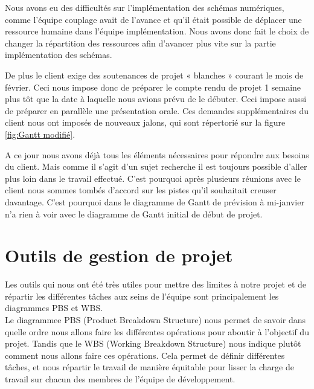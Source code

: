 \documentclass[a4paper,12pt]{report}
\theoremstyle{break}
\begin{document}
Nous avons eu des difficultés sur l’implémentation des schémas numériques, comme l’équipe couplage avait de l’avance et qu’il était possible de déplacer une ressource humaine dans l’équipe implémentation. Nous avons donc fait le choix de changer la répartition des ressources afin d’avancer plus vite sur la partie implémentation des schémas. 

De plus le client exige des soutenances de projet « blanches » courant le mois de février. Ceci nous impose donc de préparer le compte rendu de projet 1 semaine plus tôt que la date à laquelle nous avions prévu de le débuter. Ceci impose aussi de préparer en parallèle une présentation orale. Ces demandes supplémentaires du client nous ont imposés de nouveaux jalons, qui sont répertorié sur la figure \ref{fig:Gantt modifié}.

A ce jour nous avons déjà tous les éléments nécessaires pour répondre aux besoins du client. Mais comme il s’agit d’un sujet recherche il est toujours possible d’aller plus loin dans le travail effectué. C’est pourquoi après plusieurs réunions avec le client nous sommes tombés d’accord sur les pistes qu’il souhaitait creuser davantage. C’est pourquoi dans le diagramme de Gantt de prévision à mi-janvier n’a rien à voir avec le diagramme de Gantt initial de début de projet. 

\section{Outils de gestion de projet}

	Les outils qui nous ont été très utiles pour mettre des limites à notre projet et de répartir les différentes tâches aux seins de l'équipe sont principalement les diagrammes PBS et WBS.\\
	
	Le diagrammee PBS (Product Breakdown Structure) nous permet de savoir dans quelle ordre nous allons faire les différentes opérations pour aboutir à l'objectif du projet. Tandis que le WBS (Working Breakdown Structure) nous indique plutôt comment nous allons faire ces opérations. Cela permet de définir différentes tâches, et nous répartir le travail de manière équitable pour lisser la charge de travail sur chacun des membres de l'équipe de développement. 
	 
\end{document}
